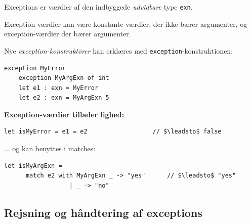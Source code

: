 \documentclass[rgb]{beamer}
\begin{document}
\begin{frame}[fragile]
\begin{footnotesize}


  Exceptions er værdier af den indbyggede \emph{udvidbare} type
  \lstinline{exn}.

  \vspace{2ex}

  Exception-værdier kan være konstante værdier, der ikke bærer
  argumenter, og exception-værdier der bærer argumenter.

  \vspace{2ex}

  Nye \emph{exception-konstruktører} kan erklæres med
  \lstinline{exception}-konstruktionen:

  \begin{lstlisting}[numbers=none,frame=none,mathescape]
    exception MyError
    exception MyArgExn of int
    let e1 : exn = MyError
    let e2 : exn = MyArgExn 5
  \end{lstlisting}

  \textbf{Exception-værdier tillader lighed:}

  \begin{lstlisting}[numbers=none,frame=none,mathescape]
    let isMyError = e1 = e2                  // $\leadsto$ false
  \end{lstlisting}

  ... og kan benyttes i matches:

  \begin{lstlisting}[numbers=none,frame=none,mathescape]
    let isMyArgExn =
      match e2 with MyArgExn _ -> "yes"      // $\leadsto$ "yes"
                  | _ -> "no"
  \end{lstlisting}


\end{footnotesize}
\end{frame}

\subsection{Rejsning og håndtering af exceptions}
\end{document}
